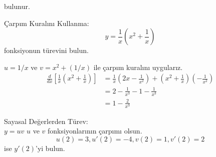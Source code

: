 bulunur.
\begin{ornek}Çarpım Kuralını Kullanma:\\
\begin{equation*}
		y=\frac{1}{x}\left(x^2+\frac{1}{x}\right)
\end{equation*}		
fonksiyonun türevini bulun.
\end{ornek}	
\begin{cozum}
$u=1/x$ ve $v=x^2+(1/x)$ ile çarpım kuralını uygularız.
	\begin{equation*}
	\begin{split}
\frac{d}{dx}\left[\frac{1}{x}\left(x^2+\frac{1}{x}\right)\right]&=\frac{1}{x}\left(2x-\frac{1}{x^2}\right)+\left(x^2+\frac{1}{x}\right)\left(-\frac{1}{x^2}\right)\\
			&=2-\frac{1}{x^3}-1-\frac{1}{x^3}\\
			&=1-\frac{2}{x^3}
	\end{split}
	\end{equation*}
\end{cozum}

\begin{ornek} Sayasal Değerlerden Türev:\\
$y=uv$ $u$ ve $v$ fonksiyonlarının çarpımı olsun.
 	\begin{equation*}
u(2)=3,	u'(2)=-4, v(2)=1, v'(2)=2
	\end{equation*}
ise $y'(2)$'yi bulun.
\end{ornek}

